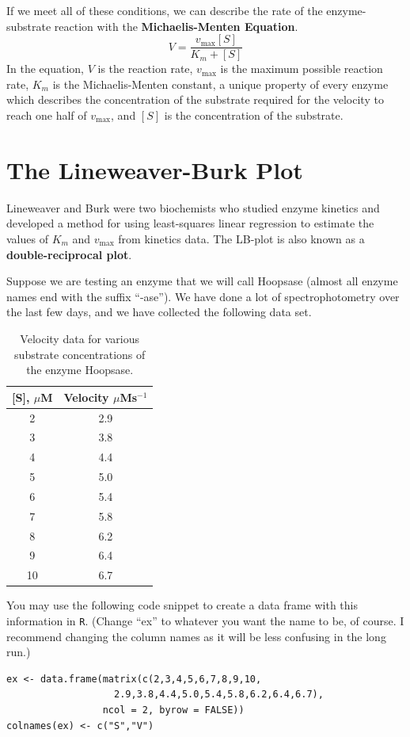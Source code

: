 \documentclass[11pt]{article}
\newcommand{\np}{\vfill\newpage}
\newcommand{\R}{\texttt{R}}
\begin{document}
If we meet all of these conditions, we can describe the rate of the enzyme-substrate reaction with the {\bf Michaelis-Menten Equation}.
\[
V = \frac{v_{\mathrm{max}}[S]}{K_m + [S]}
\]
In the equation, \(V\) is the reaction rate, \(v_{\mathrm{max}}\) is the maximum possible reaction rate, \(K_m\) is the Michaelis-Menten constant, a unique property of every enzyme which describes the concentration of the substrate required for the velocity to reach one half of \(v_{\mathrm{max}}\), and \([S]\) is the concentration of the substrate.

\np

\section*{The Lineweaver-Burk Plot}

Lineweaver and Burk were two biochemists who studied enzyme kinetics and developed a method for using least-squares linear regression to estimate the values of \(K_m\) and \(v_{\mathrm{max}}\) from kinetics data. The LB-plot is also known as a {\bf double-reciprocal plot}. 

Suppose we are testing an enzyme that we will call Hoopsase (almost all enzyme names end with the suffix ``-ase''). We have done a lot of spectrophotometry over the last few days, and we have collected the following data set.

\begin{table}[h!]
\centering
\begin{tabular}{c|c}
	[S], \(\mu\)M & Velocity \(\mu\)Ms\(^{-1}\) \\
	\hline
	2 & 2.9 \\
	3 & 3.8 \\
	4 & 4.4 \\
	5 & 5.0 \\
	6 & 5.4 \\
	7 & 5.8 \\
	8 & 6.2 \\
	9 & 6.4 \\
	10 & 6.7 
\end{tabular}
\caption{Velocity data for various substrate concentrations of the enzyme Hoopsase.}
\label{t:Hoopsase}
\end{table}

You may use the following code snippet to create a data frame with this information in \R. (Change ``ex'' to whatever you want the name to be, of course. I recommend changing the column names as it will be less confusing in the long run.)
\begin{lstlisting}
ex <- data.frame(matrix(c(2,3,4,5,6,7,8,9,10,
                   2.9,3.8,4.4,5.0,5.4,5.8,6.2,6.4,6.7),
                 ncol = 2, byrow = FALSE))
colnames(ex) <- c("S","V")
\end{lstlisting}
\end{document}
